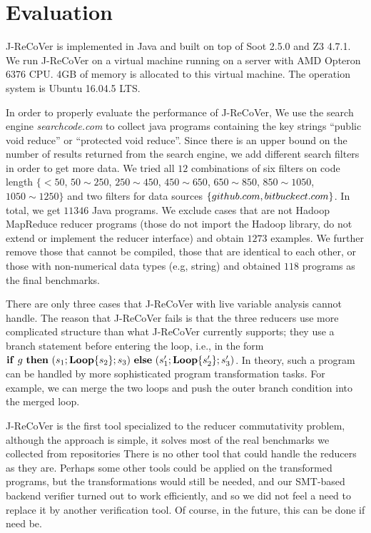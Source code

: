 \documentclass{llncs}
\newcommand{\ite}[3]{
	 \ifmmode
	 \mathbf{if}\ #1 \ \mathbf{then}\ #2\  \mathbf{else}\ #3
	 \else
	 \textbf{if}\ #1 \ \textbf{then}\ #2\  \textbf{else}\ #3
	 \fi}
\newcommand{\rloop}{
	\ifmmode
	\mathbf{Loop}
	\else
	\textbf{Loop}
	\fi}
\begin{document}
\section{Evaluation}
\label{section:exp}
J-ReCoVer is implemented in Java and built on top of Soot 2.5.0 and Z3 4.7.1. We run J-ReCoVer on a virtual machine running on a server with AMD Opteron 6376 CPU. 4GB of memory is allocated to this virtual machine. The operation system is Ubuntu 16.04.5 LTS. 

In order to properly evaluate the performance of J-ReCoVer, We use the search engine \emph{searchcode.com} to collect java programs containing the key strings ``public void reduce'' or ``protected void reduce''. Since there is an upper bound on the number of results returned from the search engine, we add different search filters in order to get more data. We tried all $12$ combinations of six filters on code length $\{<50$, $ 50\sim 250$, $250\sim 450$, $450\sim 650$, $650\sim 850$, $850\sim 1050$, $1050\sim 1250\}$
and two filters for data sources $\{github.com, bitbuckect.com\}$. In total, we get $11346$ Java programs. We exclude cases that are not Hadoop MapReduce reducer programs (those do not import the Hadoop library, do not extend or implement the reducer interface) and obtain $1273$ examples. We further remove those that cannot be compiled, those that are identical to each other, or those with non-numerical data types (e.g, string) and obtained $118$ programs as the final benchmarks.

There are only three cases that J-ReCoVer with live variable analysis cannot handle. The reason that J-ReCoVer fails is that the three reducers use more complicated structure than what J-ReCoVer currently supports; they use a branch statement before entering the loop, i.e., in the form $\ite{g}{(s_1;\rloop\{s_2\};s_3)}{(s'_1;\rloop\{s'_2\};s'_3)}$. In theory, such a program can be handled by more sophisticated program transformation tasks. For example, we can merge the two loops and push the outer branch condition into the merged loop.

J-ReCoVer is the first tool specialized to the reducer commutativity problem, although the approach is simple, it solves most of the real benchmarks we collected from repositories
There is no other tool that could handle the reducers as they are. Perhaps some other tools could be applied on the transformed programs, but the transformations would still be needed, and our SMT-based backend verifier turned out to work efficiently, and so we did not feel a need to replace it by another verification tool. Of course, in the future, this can be done if need be.
\end{document}
